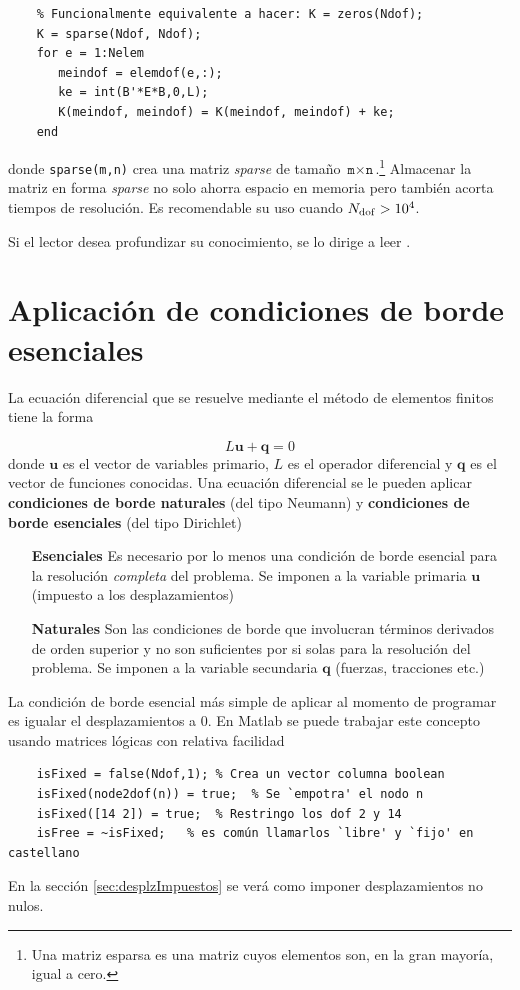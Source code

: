 \documentclass[11pt, a4paper,titlepage]{article}
\newcommand{\rmfont}[1]{{\fontfamily{ptm}\selectfont%
#1}}
\newcommand{\Matlab}{\rmfont{\sc Matlab}}
\begin{document}
\begin{verbatim}
    % Funcionalmente equivalente a hacer: K = zeros(Ndof);
    K = sparse(Ndof, Ndof); 
    for e = 1:Nelem
       meindof = elemdof(e,:);
       ke = int(B'*E*B,0,L);
       K(meindof, meindof) = K(meindof, meindof) + ke;
    end
\end{verbatim}
donde \texttt{sparse(m,n)} crea una matriz \textit{sparse} de tamaño $\texttt{m}\times\texttt{n}$.\footnote{Una matriz esparsa es una matriz cuyos elementos son, en la gran mayoría, igual a cero.} Almacenar la matriz en forma \textit{sparse} no solo ahorra espacio en memoria pero también acorta tiempos de resolución. Es recomendable su uso cuando $N_{\mathrm{dof}}>10^4$.

Si el lector desea profundizar su conocimiento, se lo dirige a leer \citet{chessa2002programing}.


\section{Aplicación de condiciones de borde esenciales}
La ecuación diferencial que se resuelve mediante el método de elementos finitos tiene la forma

\[
L\mathbf{u}+\mathbf{q}=0
\]
donde $\mathbf{u}$ es el vector de variables primario, $L$ es el operador diferencial y $\mathbf{q}$ es el vector de funciones conocidas. Una ecuación diferencial se le pueden aplicar \textbf{condiciones de borde naturales} (del tipo Neumann) y \textbf{condiciones de borde esenciales} (del tipo Dirichlet) \citep{dixit2007finite}
\begin{enumerate}
	\item[\textbf{Esenciales}] Es necesario por lo menos una condición de borde esencial para la resolución \textit{completa} del problema. Se imponen a la variable primaria $\mathbf{u}$ (impuesto a los desplazamientos)
	\item[\textbf{Naturales}] Son las condiciones de borde que involucran términos derivados de orden superior y no son suficientes por si solas para la resolución del problema. Se imponen a la variable secundaria $\mathbf{q}$ (fuerzas, tracciones etc.)
\end{enumerate}

La condición de borde esencial más simple de aplicar al momento de programar es igualar el desplazamientos a 0. En \Matlab{} se puede trabajar este concepto usando matrices lógicas con relativa facilidad
\begin{verbatim}
    isFixed = false(Ndof,1); % Crea un vector columna boolean
    isFixed(node2dof(n)) = true;  % Se `empotra' el nodo n
    isFixed([14 2]) = true;  % Restringo los dof 2 y 14
    isFree = ~isFixed;   % es común llamarlos `libre' y `fijo' en castellano
\end{verbatim}
En la sección \ref{sec:desplzImpuestos} se verá como imponer desplazamientos no nulos.
\end{document}
